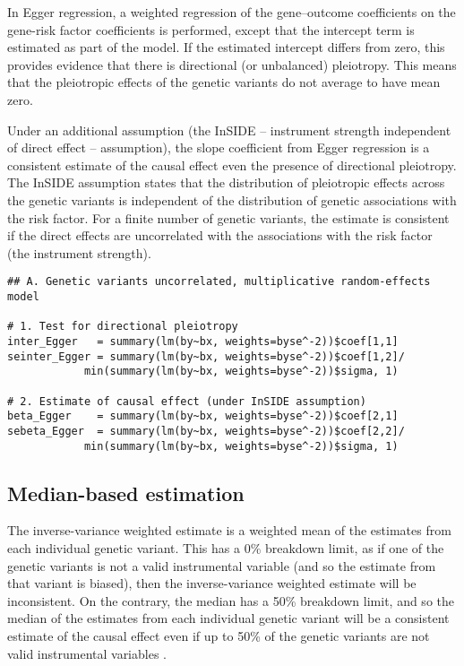 \documentclass[a4paper,12pt]{article} %
\begin{document}
In Egger regression, a weighted regression of the gene--outcome coefficients on the gene-risk factor coefficients is performed, except that the intercept term is estimated as part of the model. If the estimated intercept differs from zero, this provides evidence that there is directional (or unbalanced) pleiotropy. This means that the pleiotropic effects of the genetic variants do not average to have mean zero.

Under an additional assumption (the InSIDE -- instrument strength independent of direct effect -- assumption), the slope coefficient from Egger regression is a consistent estimate of the causal effect even the presence of directional pleiotropy. The InSIDE assumption states that the distribution of pleiotropic effects across the genetic variants is independent of the distribution of genetic associations with the risk factor. For a finite number of genetic variants, the estimate is consistent if the direct effects are uncorrelated with the associations with the risk factor (the instrument strength).

\begin{lstlisting}
## A. Genetic variants uncorrelated, multiplicative random-effects model

# 1. Test for directional pleiotropy
inter_Egger   = summary(lm(by~bx, weights=byse^-2))$coef[1,1]
seinter_Egger = summary(lm(by~bx, weights=byse^-2))$coef[1,2]/
            min(summary(lm(by~bx, weights=byse^-2))$sigma, 1)

# 2. Estimate of causal effect (under InSIDE assumption)
beta_Egger    = summary(lm(by~bx, weights=byse^-2))$coef[2,1]
sebeta_Egger  = summary(lm(by~bx, weights=byse^-2))$coef[2,2]/
            min(summary(lm(by~bx, weights=byse^-2))$sigma, 1)
\end{lstlisting}

\clearpage

\subsection{Median-based estimation}
The inverse-variance weighted estimate is a weighted mean of the estimates from each individual genetic variant. This has a 0\% breakdown limit, as if one of the genetic variants is not a valid instrumental variable (and so the estimate from that variant is biased), then the inverse-variance weighted estimate will be inconsistent. On the contrary, the median has a 50\% breakdown limit, and so the median of the estimates from each individual genetic variant will be a consistent estimate of the causal effect even if up to 50\% of the genetic variants are not valid instrumental variables \citep{han2008}.
\end{document}
